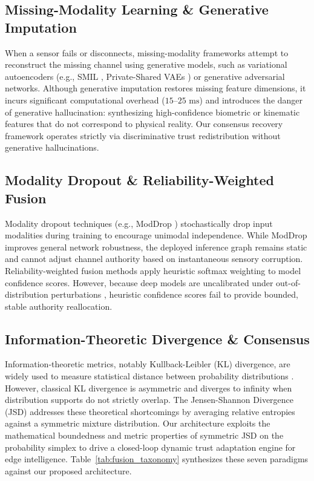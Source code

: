 \documentclass[conference]{IEEEtran}
\begin{document}
\subsection{Missing-Modality Learning \& Generative Imputation}
When a sensor fails or disconnects, missing-modality frameworks attempt to reconstruct the missing channel using generative models, such as variational autoencoders (e.g., SMIL \cite{ma2021smil}, Private-Shared VAEs \cite{lee2020private}) or generative adversarial networks. Although generative imputation restores missing feature dimensions, it incurs significant computational overhead ($15\text{--}25\text{ ms}$) and introduces the danger of generative hallucination: synthesizing high-confidence biometric or kinematic features that do not correspond to physical reality. Our consensus recovery framework operates strictly via discriminative trust redistribution without generative hallucinations.

\subsection{Modality Dropout \& Reliability-Weighted Fusion}
Modality dropout techniques (e.g., ModDrop \cite{neverova2015moddrop}) stochastically drop input modalities during training to encourage unimodal independence. While ModDrop improves general network robustness, the deployed inference graph remains static and cannot adjust channel authority based on instantaneous sensory corruption. Reliability-weighted fusion methods \cite{khaleghi2013multisensor, blundell2015weight} apply heuristic softmax weighting to model confidence scores. However, because deep models are uncalibrated under out-of-distribution perturbations \cite{guo2017calibration}, heuristic confidence scores fail to provide bounded, stable authority reallocation.

\subsection{Information-Theoretic Divergence \& Consensus}
Information-theoretic metrics, notably Kullback-Leibler (KL) divergence, are widely used to measure statistical distance between probability distributions \cite{kullback1951information}. However, classical KL divergence is asymmetric and diverges to infinity when distribution supports do not strictly overlap. The Jensen-Shannon Divergence (JSD) \cite{lin1991divergence, endres2003new} addresses these theoretical shortcomings by averaging relative entropies against a symmetric mixture distribution. Our architecture exploits the mathematical boundedness and metric properties of symmetric JSD on the probability simplex to drive a closed-loop dynamic trust adaptation engine for edge intelligence. Table~\ref{tab:fusion_taxonomy} synthesizes these seven paradigms against our proposed architecture.
\end{document}
